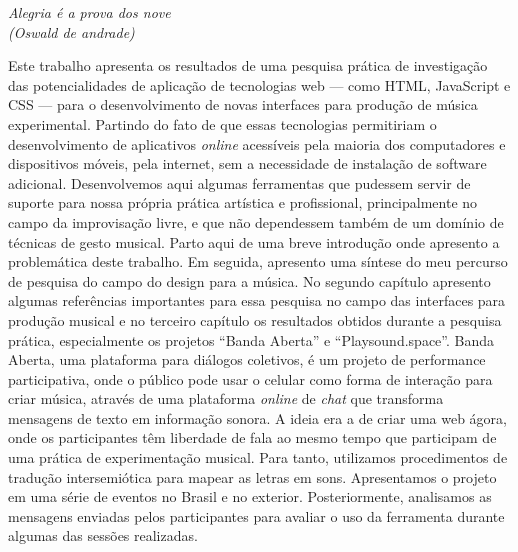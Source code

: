 \documentclass[
	12pt,				%
	openright,			%
	twoside,			%
	a4paper,			%
	english,			%
	french,				%
	spanish,			%
	brazil				%
	]{abntex2}
\begin{document}

\begin{epigrafe}
    \vspace*{\fill}
	\begin{flushright}
		\textit{Alegria é a prova dos nove \\(Oswald de andrade)}
	\end{flushright}
\end{epigrafe}


\setlength{\absparsep}{18pt} %
\begin{resumo}

Este trabalho apresenta os resultados de uma pesquisa prática de investigação das potencialidades de aplicação de tecnologias web --- como HTML, JavaScript e CSS --- para o desenvolvimento de novas interfaces para produção de música experimental. Partindo do fato de que essas tecnologias permitiriam o desenvolvimento de aplicativos \emph{online} acessíveis pela maioria dos computadores e dispositivos móveis, pela internet, sem a necessidade de instalação de software adicional. Desenvolvemos aqui algumas ferramentas que pudessem servir de suporte para nossa própria prática artística e profissional, principalmente no campo da improvisação livre, e que não dependessem também de um domínio de técnicas de gesto musical. 
Parto aqui de uma breve introdução onde apresento a problemática deste trabalho. Em seguida, apresento uma síntese do meu percurso de pesquisa do campo do design para a música. No segundo capítulo apresento algumas referências importantes para essa pesquisa no campo das interfaces para produção musical e no terceiro capítulo os resultados obtidos durante a pesquisa prática, especialmente os projetos ``Banda Aberta'' e ``Playsound.space''.
Banda Aberta, uma plataforma para diálogos coletivos,  é um projeto de performance participativa, onde o público pode usar o celular como forma de interação para criar música, através de uma plataforma \emph{online} de \emph{chat} que transforma mensagens de texto em informação sonora. A ideia era a de criar uma web ágora, onde os participantes têm liberdade de fala ao mesmo tempo que participam de uma prática de experimentação musical. Para tanto, utilizamos procedimentos de tradução intersemiótica para mapear as letras em sons.  Apresentamos o projeto em uma série de eventos no Brasil e no exterior. Posteriormente,  analisamos as mensagens enviadas pelos participantes para avaliar o uso da ferramenta durante algumas das sessões realizadas. 


\end{resumo}
\end{document}
